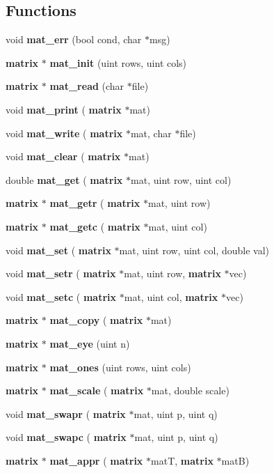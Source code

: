 \subsection*{Functions}
\begin{DoxyCompactItemize}
\item 
void \textbf{ mat\+\_\+err} (bool cond, char $\ast$msg)
\item 
\textbf{ matrix} $\ast$ \textbf{ mat\+\_\+init} (uint rows, uint cols)
\item 
\textbf{ matrix} $\ast$ \textbf{ mat\+\_\+read} (char $\ast$file)
\item 
void \textbf{ mat\+\_\+print} (\textbf{ matrix} $\ast$mat)
\item 
void \textbf{ mat\+\_\+write} (\textbf{ matrix} $\ast$mat, char $\ast$file)
\item 
void \textbf{ mat\+\_\+clear} (\textbf{ matrix} $\ast$mat)
\item 
double \textbf{ mat\+\_\+get} (\textbf{ matrix} $\ast$mat, uint row, uint col)
\item 
\textbf{ matrix} $\ast$ \textbf{ mat\+\_\+getr} (\textbf{ matrix} $\ast$mat, uint row)
\item 
\textbf{ matrix} $\ast$ \textbf{ mat\+\_\+getc} (\textbf{ matrix} $\ast$mat, uint col)
\item 
void \textbf{ mat\+\_\+set} (\textbf{ matrix} $\ast$mat, uint row, uint col, double val)
\item 
void \textbf{ mat\+\_\+setr} (\textbf{ matrix} $\ast$mat, uint row, \textbf{ matrix} $\ast$vec)
\item 
void \textbf{ mat\+\_\+setc} (\textbf{ matrix} $\ast$mat, uint col, \textbf{ matrix} $\ast$vec)
\item 
\textbf{ matrix} $\ast$ \textbf{ mat\+\_\+copy} (\textbf{ matrix} $\ast$mat)
\item 
\textbf{ matrix} $\ast$ \textbf{ mat\+\_\+eye} (uint n)
\item 
\textbf{ matrix} $\ast$ \textbf{ mat\+\_\+ones} (uint rows, uint cols)
\item 
\textbf{ matrix} $\ast$ \textbf{ mat\+\_\+scale} (\textbf{ matrix} $\ast$mat, double scale)
\item 
void \textbf{ mat\+\_\+swapr} (\textbf{ matrix} $\ast$mat, uint p, uint q)
\item 
void \textbf{ mat\+\_\+swapc} (\textbf{ matrix} $\ast$mat, uint p, uint q)
\item 
\textbf{ matrix} $\ast$ \textbf{ mat\+\_\+appr} (\textbf{ matrix} $\ast$matT, \textbf{ matrix} $\ast$matB)

\end{DoxyCompactItemize}
